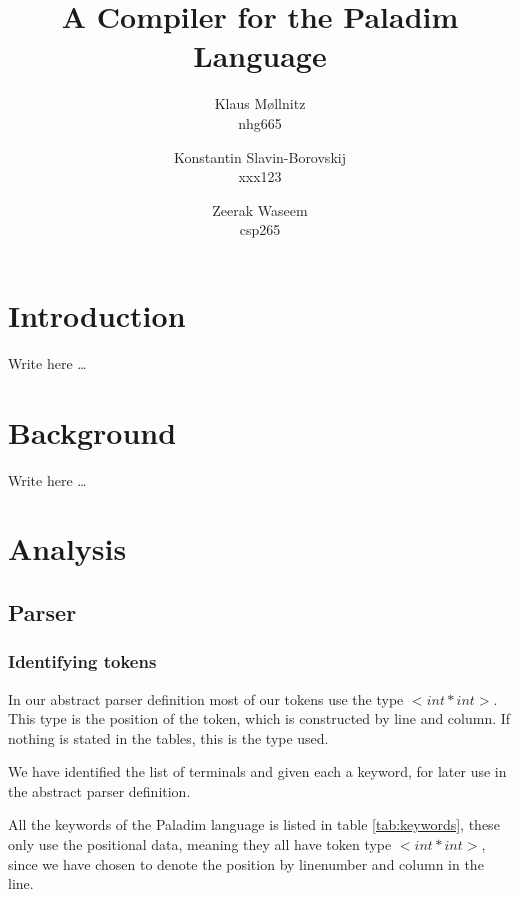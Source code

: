 \documentclass[10pt]{article}
\title{A Compiler for the \textbf{Paladim} Language}
\author{
    Klaus Møllnitz\\
    nhg665
  \and
    Konstantin Slavin-Borovskij\\
    xxx123 %
  \and
    Zeerak Waseem\\
    csp265 %
}
\begin{document}
\maketitle

\section{Introduction}
Write here \ldots

\section{Background}
Write here \ldots

\section{Analysis}
\subsection{Parser}
\subsubsection{Identifying tokens}
In our abstract parser definition most of our tokens use the type $<int*int>$. This type is the position of the token, which is constructed by line and column. If nothing is stated in the tables, this is the type used.

We have identified the list of terminals and given each a keyword, for later use in the abstract parser definition.

All the keywords of the Paladim language is listed in table \ref{tab:keywords}, these only use the positional data, meaning they all have token type $<int*int>$, since we have chosen to denote the position by linenumber and column in the line.
\end{document}
